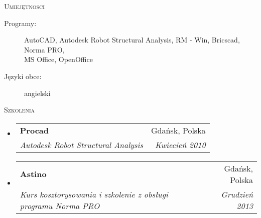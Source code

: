 \documentclass[letterpaper,11pt]{article}
\makeatletter
\newcommand{\resheading}[1]{
  \begin{tcolorbox}
  \textsc{#1}
  \end{tcolorbox}
}
\newcommand{\ressubheading}[4]{
\begin{tabular*}{6.5in}{l@{\extracolsep{\fill}}r}
		\textbf{#1} & #2 \\
		\textit{#3} & \textit{#4} \\
\end{tabular*}\vspace{-6pt}}
\makeatother
\begin{document}
\resheading{Umiejętnosci}

\begin{description}
 \item[Programy:]
   AutoCAD, Autodesk Robot Structural Analysis, RM - Win, Bricscad, Norma PRO,\\
   MS Office, OpenOffice
 \item[Języki obce:]
   angielski
\end{description}

\resheading{Szkolenia}

\begin{itemize}
\item
  \ressubheading{Procad}{Gdańsk, Polska}{Autodesk Robot Structural Analysis}{Kwiecień 2010}
\item
  \ressubheading{Astino}{Gdańsk, Polska}{Kurs kosztorysowania i szkolenie z obsługi programu Norma PRO}{Grudzień 2013}
\end{itemize}
\end{document}
